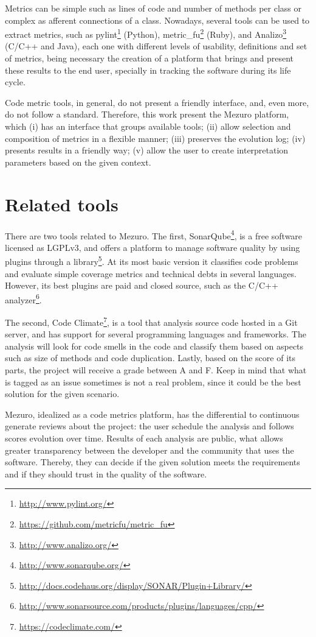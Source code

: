 \documentclass{llncs}
\begin{document}
Metrics can be simple such as lines of code and number of methods per class or
complex as afferent connections of a class. Nowadays, several tools can be
used to extract metrics, such as
pylint\footnote{\url{http://www.pylint.org/}} (Python),
metric\_fu\footnote{\url{https://github.com/metricfu/metric_fu}} (Ruby), and
Analizo\footnote{\url{http://www.analizo.org/}} (C/C++ and Java), each one with
different levels of usability, definitions and set of metrics, being necessary
the creation of a platform that brings and present these results to the end
user, specially in tracking the software during its life cycle.

Code metric tools, in general, do not present a friendly interface, and,
even more, do not follow a standard. Therefore, this work present the
Mezuro platform, which (i) has an interface that groups available tools;
(ii) allow selection and composition of metrics in a flexible manner;
(iii) preserves the evolution log;
(iv) presents results in a friendly way;
(v) allow the user to create interpretation parameters based on the given
context.

\section{Related tools}

There are two tools related to Mezuro. The first, SonarQube\footnote{\url{http://www.sonarqube.org/}}, is a free software licensed as LGPLv3, and offers a platform to manage software quality by using plugins through a 
library\footnote{\url{http://docs.codehaus.org/display/SONAR/Plugin+Library/}}.
At its most basic version it classifies code problems and evaluate simple
coverage metrics and technical debts in several languages. However, its best
plugins are paid and closed source, such as the
C/C++ analyzer\footnote{\url{http://www.sonarsource.com/products/plugins/languages/cpp/}}.

The second, Code Climate\footnote{\url{https://codeclimate.com/}}, is a tool
that analysis source code hosted in a Git server, and has support for several
programming languages and frameworks. The analysis will look for code smells
in the code and classify them based on aspects such as size of methods and
code duplication. Lastly, based on the score of its parts, the project will
receive a grade between A and F. Keep in mind that what is tagged as an issue
sometimes is not a real problem, since it could be the best solution for the
given scenario.

Mezuro, idealized as a code metrics platform, has the differential to
continuous generate reviews about the project: the user schedule the
analysis and follows scores evolution over time. Results of each analysis
are public, what allows greater transparency between the developer and the
community that uses the software. Thereby, they can decide if the given solution
meets the requirements and if they should trust in the quality of the software.
\end{document}
